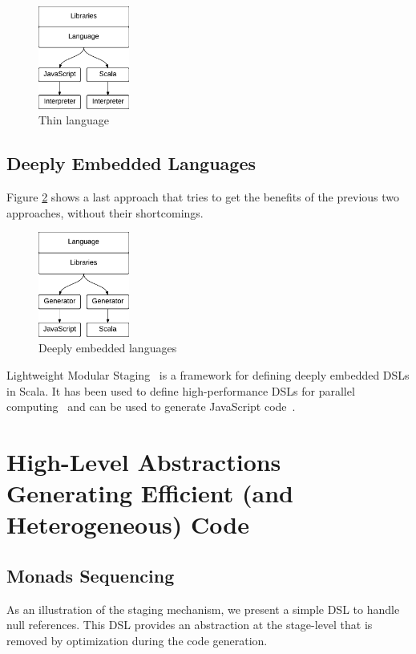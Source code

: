 \documentclass[preprint]{sigplanconf}
\begin{document}
\begin{figure}
  \centering
  \includegraphics[width=3cm]{thin.pdf}
  \caption{Thin language}
  \label{thin-lang}
\end{figure}

\subsection{Deeply Embedded Languages}

Figure \ref{dedsl} shows a last approach that tries to get the benefits of the previous two approaches, without
their shortcomings.

\begin{figure}
  \centering
  \includegraphics[width=3cm]{lms.pdf}
  \caption{Deeply embedded languages}
  \label{dedsl}
\end{figure}

Lightweight Modular Staging~\cite{Rompf12_LMSThesis} is a framework for defining deeply embedded DSLs in Scala. It
has been used to define high-performance DSLs for parallel computing~\cite{Brown11_Parallel} and can be used to
generate JavaScript code~\cite{Kossakowski12_JsDESL}.

\section{High-Level Abstractions Generating Efficient (and Heterogeneous) Code}
\label{contribution}

\subsection{Monads Sequencing}

As an illustration of the staging mechanism, we present a simple DSL to handle null references. This DSL provides an
abstraction at the stage-level that is removed by optimization during the code generation.
\end{document}
